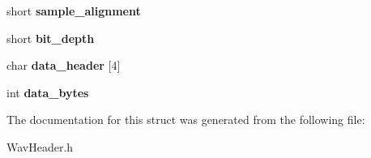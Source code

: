 \begin{DoxyCompactItemize}
\mbox{\label{structwave__header_a253ab889dc04b22baf9b6284ae4c8986}} 
short {\bfseries sample\+\_\+alignment}
\item 
\mbox{\label{structwave__header_adc38599ddb92a99569f5bfe6f2e9bbb1}} 
short {\bfseries bit\+\_\+depth}
\item 
\mbox{\label{structwave__header_ab84f2f54f0693c8ddcb0255fa9156918}} 
char {\bfseries data\+\_\+header} \mbox{[}4\mbox{]}
\item 
\mbox{\label{structwave__header_ad758e48c3957514701d3f9bccb002b0d}} 
int {\bfseries data\+\_\+bytes}
\end{DoxyCompactItemize}


The documentation for this struct was generated from the following file\+:\begin{DoxyCompactItemize}
\item 
Wav\+Header.\+h\end{DoxyCompactItemize}
